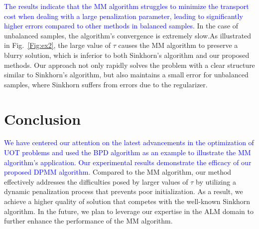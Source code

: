 \documentclass[conference]{IEEEtran}
\newcommand{\changeSX}[1]{\textcolor{blue}{#1}}
\begin{document}
\changeSX{The results indicate that the MM algorithm struggles to minimize the transport cost when dealing with a large penalization parameter, leading to significantly higher errors compared to other methods in balanced samples.} In the case of unbalanced samples, the algorithm's convergence is extremely slow.As illustrated in Fig.~\ref{Fig:ex2}, the large value of $\tau$ causes the MM algorithm to preserve a blurry solution, which is inferior to both Sinkhorn's algorithm and our proposed methods. Our approach not only rapidly solves the problem with a clear structure similar to Sinkhorn's algorithm, but also maintains a small error for unbalanced samples, where Sinkhorn suffers from errors due to the regularizer.



\section{Conclusion}
\changeSX{We have centered our attention on the latest advancements in the optimization of UOT problems and used the BPD algorithm as an example to illustrate the MM algorithm's application. Our experimental results demonstrate the efficacy of our proposed DPMM algorithm.} Compared to the MM algorithm, our method effectively addresses the difficulties posed by larger values of $\tau$ by utilizing a dynamic penalization process that prevents poor initialization. As a result, we achieve a higher quality of solution that competes with the well-known Sinkhorn algorithm. In the future, we plan to leverage our expertise in the ALM domain to further enhance the performance of the MM algorithm.






\color{red}
\end{document}
